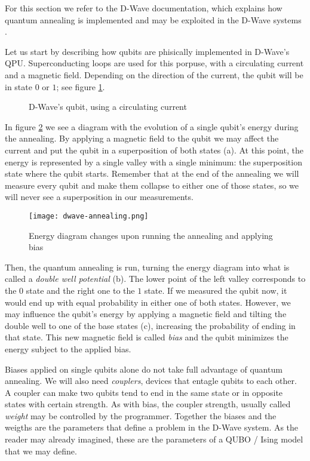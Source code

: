 For this section we refer to the D-Wave documentation, which explains how quantum annealing is implemented and may be exploited in the D-Wave systems \cite{DWaveDoc-QuantumAnnealing}.

Let us start by describing how qubits are phisically implemented in D-Wave's QPU. Superconducting loops are used for this porpuse, with a circulating current and a magnetic field. Depending on the direction of the current, the qubit will be in state $0$ or $1$; see figure \ref{fig:dwave-qubit}.

\begin{figure}[h]
	\centering
	\caption{D-Wave's qubit, using a circulating current \cite{DWaveDoc-QuantumAnnealing}}
	\label{fig:dwave-qubit}
\end{figure}

In figure \ref{fig:dwave-annealing} we see a diagram with the evolution of a single qubit's energy during the annealing. By applying a magnetic field to the qubit we may affect the current and put the qubit in a superposition of both states (a). At this point, the energy is represented by a single valley with a single minimum: the superposition state where the qubit starts. Remember that at the end of the annealing we will measure every qubit and make them collapse to either one of those states, so we will never see a superposition in our measurements.

\begin{figure}[h]
	\texttt{[image: dwave-annealing.png]}
	\centering
	\caption{Energy diagram changes upon running the annealing and applying bias \cite{DWaveDoc-QuantumAnnealing}}
	\label{fig:dwave-annealing}
\end{figure}

Then, the quantum annealing is run, turning the energy diagram into what is called a \emph{double well potential} (b). The lower point of the left valley corresponds to the $0$ state and the right one to the $1$ state. If we measured the qubit now, it would end up with equal probability in either one of both states. However, we may influence the qubit's energy by applying a magnetic field and tilting the double well to one of the base states (c), increasing the probability of ending in that state. This new magnetic field is called \emph{bias} and the qubit minimizes the energy subject to the applied bias.

Biases applied on single qubits alone do not take full advantage of quantum annealing. We will also need \emph{couplers}, devices that entagle qubits to each other. A coupler can make two qubits tend to end in the same state or in opposite states with certain strength. As with bias, the coupler strength, usually called \emph{weight}  may be controlled by the programmer. Together the biases and the weigths are the parameters that define a problem in the D-Wave system. As the reader may already imagined, these are the parameters of a QUBO / Ising model that we may define.

